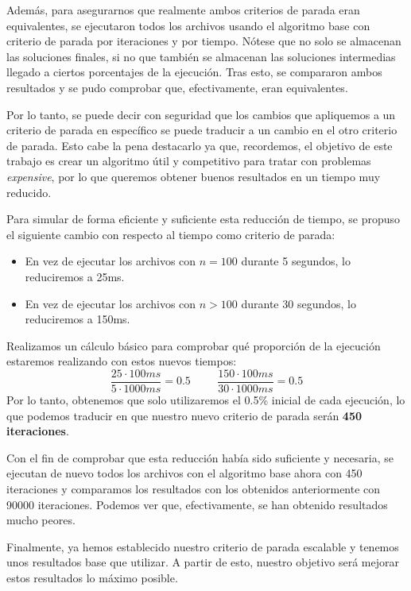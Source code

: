Además, para asegurarnos que realmente ambos criterios de parada eran equivalentes, se ejecutaron todos los archivos usando el algoritmo base con criterio de parada por iteraciones y por tiempo. 
Nótese que no solo se almacenan las soluciones finales, si no que también se almacenan las soluciones intermedias llegado a ciertos porcentajes de la ejecución. 
Tras esto, se compararon ambos resultados y se pudo comprobar que, efectivamente, eran equivalentes. 

Por lo tanto, se puede decir con seguridad que los cambios que apliquemos a un criterio de parada en específico se puede traducir a un cambio en el otro criterio de parada. 
Esto cabe la pena destacarlo ya que, recordemos, el objetivo de este trabajo es crear un algoritmo útil y competitivo para tratar con problemas \textit{expensive}, por lo que queremos obtener buenos resultados en un tiempo muy reducido. 

Para simular de forma eficiente y suficiente esta reducción de tiempo, se propuso el siguiente cambio con respecto al tiempo como criterio de parada:
\begin{itemize}
	\item En vez de ejecutar los archivos con $n=100$ durante 5 segundos, lo reduciremos a 25ms.
	\item En vez de ejecutar los archivos con $n>100$ durante 30 segundos, lo reduciremos a 150ms.
\end{itemize}
Realizamos un cálculo básico para comprobar qué proporción de la ejecución estaremos realizando con estos nuevos tiempos:
\begin{equation*}
\dfrac{25\cdot 100ms}{5\cdot 1000ms} = 0.5
\hspace{1cm}
\dfrac{150\cdot 100ms}{30\cdot 1000ms} = 0.5
\end{equation*}
Por lo tanto, obtenemos que solo utilizaremos el 0.5\% inicial de cada ejecución, lo que podemos traducir en que nuestro nuevo criterio de parada serán \textbf{450 iteraciones}. 

Con el fin de comprobar que esta reducción había sido suficiente y necesaria, se ejecutan de nuevo todos los archivos con el algoritmo base ahora con 450 iteraciones y comparamos los resultados con los obtenidos anteriormente con 90000 iteraciones. 
Podemos ver que, efectivamente, se han obtenido resultados mucho peores. 

Finalmente, ya hemos establecido nuestro criterio de parada escalable y tenemos unos resultados base que utilizar. 
A partir de esto, nuestro objetivo será mejorar estos resultados lo máximo posible.

